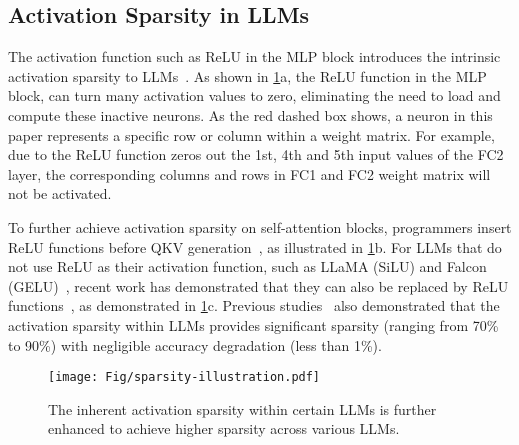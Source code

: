 \subsection{Activation Sparsity in LLMs}\label{sec:activation-sparsity}

The activation function such as ReLU in the MLP block introduces the intrinsic activation sparsity to LLMs~\cite{liu2023deja, mirzadeh2023relu, song2024prosparse}. As shown in \fig \ref{fig:pruning-network}a, the ReLU function in the MLP block, can turn many activation values to zero, eliminating the need to load and compute these inactive neurons. As the red dashed box shows, a neuron in this paper represents a specific row or column within a weight matrix. For example, due to the ReLU function zeros out the 1st, 4th and 5th input values of the FC2 layer, the corresponding columns and rows in FC1 and FC2 weight matrix will not be activated. 

To further achieve activation sparsity on self-attention blocks, programmers insert ReLU functions before QKV generation~\cite{mirzadeh2023relu}, as illustrated in \fig \ref{fig:pruning-network}b. For LLMs that do not use ReLU as their activation function, such as LLaMA (SiLU) and Falcon (GELU)~\cite{touvron2023llama2, almazrouei2023falcon}, recent work has demonstrated that they can also be replaced by ReLU functions~\cite{mirzadeh2023relu, song2024prosparse}, as demonstrated in \fig \ref{fig:pruning-network}c. Previous studies~\cite{song2024turbo, zheng2024learn, song2024prosparse} also demonstrated that the activation sparsity within LLMs provides significant sparsity (ranging from 70\% to 90\%) with negligible accuracy degradation (less than 1\%).

\begin{figure}
    \centering
    \texttt{[image: Fig/sparsity-illustration.pdf]}
    \vspace{-0.3cm}
    \caption{The inherent activation sparsity within certain LLMs is further enhanced to achieve higher sparsity across various LLMs.}
    \label{fig:pruning-network}
\vspace{-0.3cm}
\end{figure}

